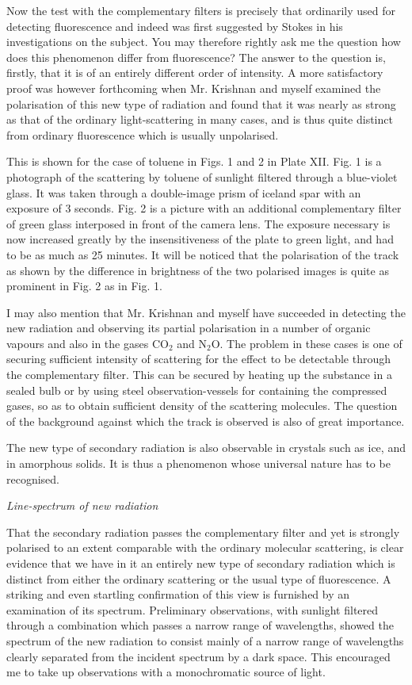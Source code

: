 Now the test with the complementary filters is precisely that ordinarily used for detecting fluorescence and indeed was first suggested by Stokes in his investigations on the subject. You may therefore rightly ask me the question how does this phenomenon differ from fluorescence? The answer to the question is, firstly, that it is of an entirely different order of intensity. A more satisfactory proof was however forthcoming when Mr. Krishnan and myself examined the polarisation of this new type of radiation and found that it was nearly as strong as that of the ordinary light-scattering in many cases, and is thus quite distinct from ordinary fluorescence which is usually unpolarised.

This is shown for the case of toluene in Figs. 1\label{pageref-1} and 2 in Plate XII. Fig. 1 is a photograph of the scattering by toluene of sunlight filtered through a blue-violet glass. It was taken through a double-image prism of iceland spar with an exposure of 3 seconds. Fig. 2 is a picture with an additional complementary filter of green glass interposed in front of the camera lens. The exposure necessary is now increased greatly by the insensitiveness of the plate to green light, and had to be as much as 25 minutes. It will be noticed that the polarisation of the track as shown by the difference in brightness of the two polarised images is quite as prominent in Fig. 2 as in Fig. 1.

I may also mention that Mr. Krishnan and myself have succeeded in detecting the new radiation and observing its partial polarisation in a number of organic vapours and also in the gases CO$_{2}$ and N$_{2}$O. The problem in these cases is one of securing sufficient intensity of scattering for the effect to be detectable through the complementary filter. This can be secured by heating up the substance in a sealed bulb or by using steel observation-vessels for containing the compressed gases, so as to obtain sufficient density of the scattering molecules. The question of the background against which the track is observed is also of great importance.

\eject

The new type of secondary radiation is also observable in crystals such as ice, and in amorphous solids. It is thus a phenomenon whose universal nature has to be recognised.

\medskip
\noindent
{\em Line-spectrum of new radiation}\label{pageref-2}
\smallskip

That the secondary radiation passes the complementary filter and yet is strongly polarised to an extent comparable with the ordinary molecular scattering, is clear evidence that we have in it an entirely new type of secondary radiation which is distinct from either the ordinary scattering or the usual type of fluorescence. A striking and even startling confirmation of this view is furnished by an examination of its spectrum. Preliminary observations, with sunlight filtered through a combination which passes a narrow range of wavelengths, showed the spectrum of the new radiation to consist mainly of a narrow range of wavelengths clearly separated from the incident spectrum by a dark space. This encouraged me to take up observations with a monochromatic source of light.

